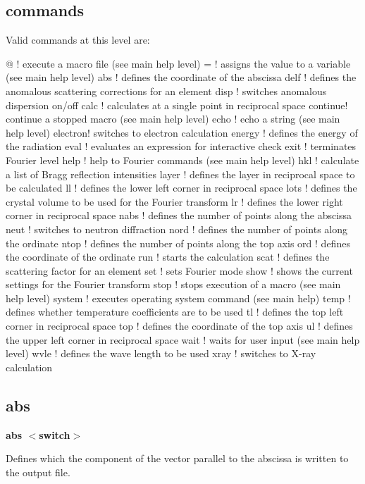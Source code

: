 \subsection*{commands}
Valid commands at this level are: 
\par
\begin{MacVerbatim}
@       ! execute a macro file (see main help level)
=       ! assigns the value to a variable (see main help level)
abs     ! defines the coordinate of the abscissa
delf    ! defines the anomalous scattering corrections for an element
disp    ! switches anomalous dispersion on/off
calc    ! calculates at a single point in reciprocal space
continue! continue a stopped macro (see main help level)
echo    ! echo a string (see main help level)
electron! switches to electron calculation
energy  ! defines the energy of the radiation
eval    ! evaluates an expression for interactive check
exit    ! terminates Fourier level
help    ! help to Fourier commands (see main help level)
hkl     ! calculate a list of Bragg reflection intensities
layer   ! defines the layer in reciprocal space to be calculated
ll      ! defines the lower left corner in reciprocal space
lots    ! defines the crystal volume to be used for the Fourier transform
lr      ! defines the lower right corner in reciprocal space
nabs    ! defines the number of points along the abscissa
neut    ! switches to neutron diffraction
nord    ! defines the number of points along the ordinate
ntop    ! defines the number of points along the top axis
ord     ! defines the coordinate of the ordinate
run     ! starts the calculation
scat    ! defines the scattering factor for an element
set     ! sets Fourier mode
show    ! shows the current settings for the Fourier transform
stop    ! stops execution of a macro (see main help level)
system  ! executes operating system command (see main help)
temp    ! defines whether temperature coefficients are to be used
tl      ! defines the top   left corner in reciprocal space
top     ! defines the coordinate of the top axis
ul      ! defines the upper left corner in reciprocal space
wait    ! waits for user input (see main help level)
wvle    ! defines the wave length to be used
xray    ! switches to X-ray calculation
\end{MacVerbatim}
\subsection*{abs}
{\bf abs $ <$switch$> $ \par }
\par
\vspace{3pt}
Defines which the component of the vector parallel to the abscissa 
is written to the output file. 
